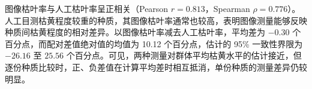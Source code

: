 图像枯叶率与人工枯叶率呈正相关（Pearson \(r=0.813\)，Spearman \(\rho=0.776\)）。人工目测枯黄程度较重的种质，其图像枯叶率通常也较高，表明图像测量能够反映种质间枯黄程度的相对差异。以图像枯叶率减去人工枯叶率，平均差为 \(-0.30\) 个百分点，而配对差值绝对值的均值为 10.12 个百分点，估计的 95\% 一致性界限为 \(-26.16\) 至 \(25.56\) 个百分点。可见，两种测量对群体平均枯黄水平的估计接近，但逐份种质比较时，正、负差值在计算平均差时相互抵消，单份种质的测量差异仍较明显。





